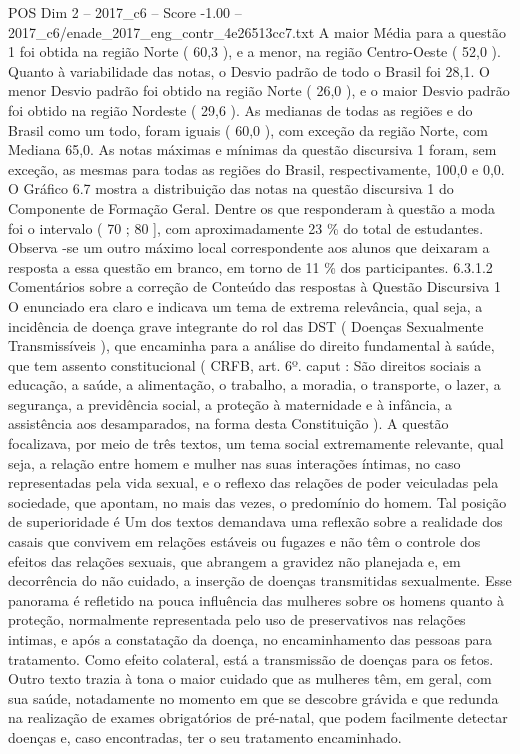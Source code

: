 \begin{textsample}{POS Dim 2 – 2017\_c6 – Score -1.00 – 2017\_c6/enade\_2017\_eng\_contr\_4e26513cc7.txt}
A maior Média para a questão 1 foi obtida na região Norte ( 60,3 ), e a menor, na região Centro-Oeste ( 52,0 ).
Quanto à variabilidade das notas, o Desvio padrão de todo o Brasil foi 28,1.
O menor Desvio padrão foi obtido na região Norte ( 26,0 ), e o maior Desvio padrão foi obtido na região Nordeste ( 29,6 ).
As medianas de todas as regiões e do Brasil como um todo, foram iguais ( 60,0 ), com exceção da região Norte, com Mediana 65,0.
As notas máximas e mínimas da questão discursiva 1 foram, sem exceção, as mesmas para todas as regiões do Brasil, respectivamente, 100,0 e 0,0.
O Gráfico 6.7 mostra a distribuição das notas na questão discursiva 1 do Componente de Formação Geral.
Dentre os que responderam à questão a moda foi o intervalo ( 70 ; 80 ], com aproximadamente 23 \% do total de estudantes.
Observa -se um outro máximo local correspondente aos alunos que deixaram a resposta a essa questão em branco, em torno de 11 \% dos participantes. 6.3.1.2 Comentários sobre a correção de Conteúdo das respostas à Questão Discursiva 1 O enunciado era claro e indicava um tema de extrema relevância, qual seja, a incidência de doença grave integrante do rol das DST ( Doenças Sexualmente Transmissíveis ), que encaminha para a análise do direito fundamental à saúde, que tem assento constitucional ( CRFB, art. 6º. caput : São direitos sociais a educação, a saúde, a alimentação, o trabalho, a moradia, o transporte, o lazer, a segurança, a previdência social, a proteção à maternidade e à infância, a assistência aos desamparados, na forma desta Constituição ).
A questão focalizava, por meio de três textos, um tema social extremamente relevante, qual seja, a relação entre homem e mulher nas suas interações íntimas, no caso representadas pela vida sexual, e o reflexo das relações de poder veiculadas pela sociedade, que apontam, no mais das vezes, o predomínio do homem.
Tal posição de superioridade é Um dos textos demandava uma reflexão sobre a realidade dos casais que convivem em relações estáveis ou fugazes e não têm o controle dos efeitos das relações sexuais, que abrangem a gravidez não planejada e, em decorrência do não cuidado, a inserção de doenças transmitidas sexualmente.
Esse panorama é refletido na pouca influência das mulheres sobre os homens quanto à proteção, normalmente representada pelo uso de preservativos nas relações intimas, e após a constatação da doença, no encaminhamento das pessoas para tratamento.
Como efeito colateral, está a transmissão de doenças para os fetos.
Outro texto trazia à tona o maior cuidado que as mulheres têm, em geral, com sua saúde, notadamente no momento em que se descobre grávida e que redunda na realização de exames obrigatórios de pré-natal, que podem facilmente detectar doenças e, caso encontradas, ter o seu tratamento encaminhado.

\end{textsample}
